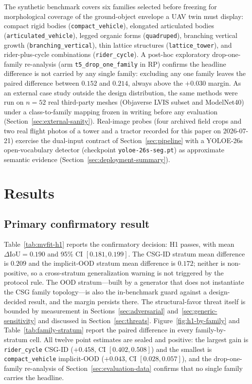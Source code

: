 \documentclass[11pt,a4paper]{article}
\begin{document}
The synthetic benchmark covers six families selected before freezing for
morphological coverage of the ground-object envelope a UAV twin must display:
compact rigid bodies (\texttt{compact\_vehicle}), elongated articulated bodies
(\texttt{articulated\_vehicle}), legged organic forms (\texttt{quadruped}),
branching vertical growth (\texttt{branching\_vertical}), thin lattice
structures (\texttt{lattice\_tower}), and rider-plus-cycle combinations
(\texttt{rider\_cycle}). A post-hoc exploratory drop-one-family re-analysis
(arm \texttt{t5\_drop\_one\_family} in RP) confirms the headline difference is
not carried by any single family: excluding any one family leaves the paired
difference between \(0.152\) and \(0.214\), always above the \(+0.030\)
margin. As an external case study outside the design distribution, the same
methods were run on \(n{=}52\) real third-party meshes (Objaverse LVIS subset
and ModelNet40) under a class-to-family mapping frozen in writing before any
evaluation (Section~\ref{sec:external-sanity}). Real-image probes (four
archived field crops and two real flight photos of a tower and a tractor
recorded for
this paper on 2026-07-21) exercise the dual-input contract of
Section~\ref{sec:pipeline} with a
YOLOE-26s open-vocabulary detector (checkpoint \texttt{yoloe-26s-seg.pt}) as
approximate semantic evidence (Section~\ref{sec:deployment-summary}).

\section{Results}
\label{sec:primary-results}

\subsection{Primary confirmatory result}

Table~\ref{tab:mvfit-h1} reports the confirmatory decision: H1 passes, with
mean \(\Delta\mathrm{IoU}=0.190\) and 95\% CI \([0.181,0.199]\). The CSG-ID
stratum mean difference is \(0.209\) and the implicit-OOD stratum mean
difference is \(0.172\); neither is non-positive, so a cross-stratum
generalization warning is not triggered by the protocol rule. The OOD
stratum---built by a generator that does not instantiate the CSG family
topology---is also the in-benchmark guard against a design-decided result,
and the margin persists there. The
structural-favor threat itself is bounded by measurement in
Sections~\ref{sec:adversarial} and~\ref{sec:generic-sensitivity} and
discussed in Section~\ref{sec:threats}.
Figure~\ref{fig:h1-by-family} and Table~\ref{tab:family-stratum} report the
paired difference in every family-by-stratum cell. All twelve point estimates
are sealed and positive: the largest gain is \texttt{rider\_cycle} CSG-ID
(\(+0.458\), CI \([0.402,0.508]\)) and the smallest is
\texttt{compact\_vehicle} implicit-OOD (\(+0.043\), CI \([0.028,0.057]\)),
and the drop-one-family re-analysis of Section~\ref{sec:evaluation-data}
confirms that no single family carries the headline.
\end{document}
